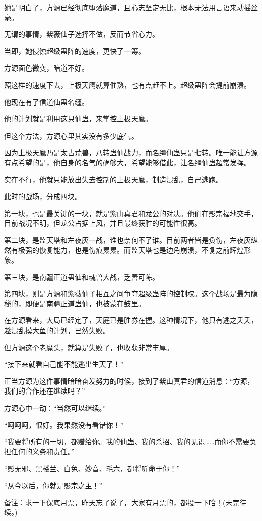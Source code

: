 \begin{this_body}
她是明白了，方源已经彻底堕落魔道，且心志坚定无比，根本无法用言语来动摇丝毫。

无谓的事情，紫薇仙子选择不做，反而节省心力。

当即，她侵蚀超级蛊阵的速度，更快了一筹。

方源面色微变，暗道不好。

照这样的速度下去，上极天鹰就算催熟，也有点赶不上。超级蛊阵会提前崩溃。

他现在有了信道仙蛊名缰。

他的计划就是利用这只仙蛊，来掌控上极天鹰。

但这个方法，方源心里其实没有多少底气。

因为上极天鹰乃是太古荒兽，八转蛊仙战力，而名缰仙蛊只是七转。唯一能让方源有点希望的是，他自身的名气的确够大，希望能够借此，让名缰仙蛊超常发挥。

实在不行，他就只能放出失去控制的上极天鹰，制造混乱，自己逃跑。

此时的战场，分成四块。

第一块，也是最关键的一块，就是紫山真君和龙公的对决。他们在影宗福地交手，目前战况不明，但龙公占据上风，并且最终获胜的可能性很高。

第二块，是监天塔和左夜灰一战，谁也奈何不了谁。目前两者皆是负伤，左夜灰纵然有极强的恢复能力，也是伤痕累累。而监天塔也是边角崩溃，不复之前辉煌形象。

第三块，是南疆正道蛊仙和魂兽大战，乏善可陈。

第四块，则是方源和紫薇仙子相互之间争夺超级蛊阵的控制权。这个战场是最为隐秘的，即便是南疆正道蛊仙，也被蒙在鼓里。

在方源看来，大局已经定了，天庭已是胜券在握。这种情况下，他只有逃之夭夭，趁混乱摸大鱼的计划，已然失败。

但方源这个老魔头，就算是失败了，也收获非常丰厚。

“接下来就看自己能不能逃出生天了！”

正当方源为这件事情暗暗奋发努力的时候，接到了紫山真君的信道消息：“方源，我们的合作还在继续吗？”

方源心中一动：“当然可以继续。”

“呵呵呵，很好。我果然没有看错你！”

“我要将所有的一切，都赠给你。我的仙蛊、我的杀招、我的见识……而你不需要负担任何的义务和责任。”

“影无邪、黑楼兰、白兔、妙音、毛六，都将听命于你！”

“从今以后，你就是影宗之主！”

备注：求一下保底月票，昨天忘了说了，大家有月票的，都投一下哈！(未完待续。)

\end{this_body}


